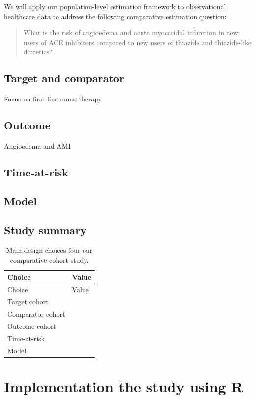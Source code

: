 \documentclass[]{book}
\begin{document}
We will apply our population-level estimation framework to observational
healthcare data to address the following comparative estimation
question:

\begin{quote}
What is the risk of angioedema and acute myocaridal infarction in new
users of ACE inhibitors compared to new users of thiazide and
thiazide-like diuretics?
\end{quote}

\subsection{Target and comparator}\label{target-and-comparator}

Focus on first-line mono-therapy

\subsection{Outcome}\label{outcome}

Angioedema and AMI

\subsection{Time-at-risk}\label{time-at-risk}

\subsection{Model}\label{model}

\subsection{Study summary}\label{study-summary}

\begin{longtable}[]{@{}ll@{}}
\caption{\label{tab:aceChoices} Main design choices four our comparative
cohort study.}\tabularnewline
\toprule
Choice & Value\tabularnewline
\midrule
\endfirsthead
\toprule
Choice & Value\tabularnewline
\midrule
\endhead
Target cohort &\tabularnewline
Comparator cohort &\tabularnewline
Outcome cohort &\tabularnewline
Time-at-risk &\tabularnewline
Model &\tabularnewline
\bottomrule
\end{longtable}

\section{Implementation the study using
R}\label{implementation-the-study-using-r}
\end{document}
